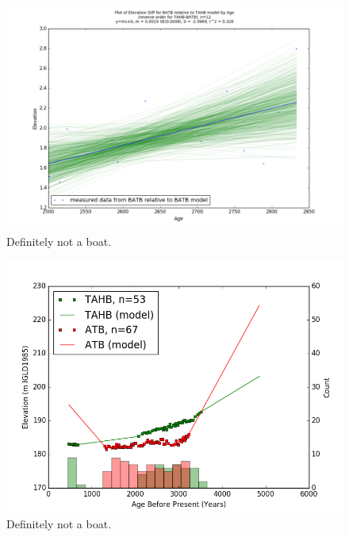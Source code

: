 \documentclass{article}
\begin{document}
\begin{figure}[h]
	\includegraphics[width=\linewidth]{data/gias/theGIA_BATB_relative_to_TAHB.png}
	\caption{Definitely not a boat.}
	\label{fig:gias_BATBxTAHB}
\end{figure}
\newpage








\begin{figure}[h]
	\includegraphics[width=\linewidth]{data/TAHB-ATB_DataAndModel.png}
	\caption{Definitely not a boat.}
	\label{fig:data_TAHBxBATB}
\end{figure}
\newpage
\end{document}
